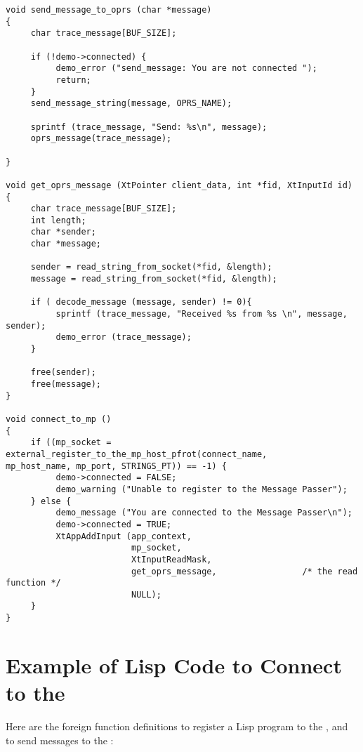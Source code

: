 \begin{verbatim}
void send_message_to_oprs (char *message)
{
     char trace_message[BUF_SIZE];

     if (!demo->connected) {
          demo_error ("send_message: You are not connected ");
          return;
     }
     send_message_string(message, OPRS_NAME);

     sprintf (trace_message, "Send: %s\n", message);
     oprs_message(trace_message);

}

void get_oprs_message (XtPointer client_data, int *fid, XtInputId id)
{
     char trace_message[BUF_SIZE];
     int length;
     char *sender;
     char *message;

     sender = read_string_from_socket(*fid, &length);
     message = read_string_from_socket(*fid, &length);

     if ( decode_message (message, sender) != 0){
          sprintf (trace_message, "Received %s from %s \n", message, sender);
          demo_error (trace_message);
     }

     free(sender);
     free(message);
}

void connect_to_mp ()
{
     if ((mp_socket = external_register_to_the_mp_host_pfrot(connect_name,
mp_host_name, mp_port, STRINGS_PT)) == -1) {
          demo->connected = FALSE;
          demo_warning ("Unable to register to the Message Passer");
     } else {
          demo_message ("You are connected to the Message Passer\n");
          demo->connected = TRUE;
          XtAppAddInput (app_context,
                         mp_socket,
                         XtInputReadMask,
                         get_oprs_message,                 /* the read function */
                         NULL);
     }
}

\end{verbatim}

\section{Example of Lisp Code to Connect to the \MPA{}}

Here are the foreign function definitions to register a Lisp program to
the \MPA{}, and to send messages to the \MPA{}:

